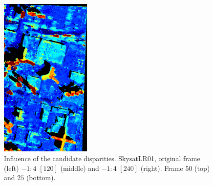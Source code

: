 \documentclass{article}
\theoremstyle{definition}
\begin{document}
\begin{figure}[ht]
 \includegraphics[height=8cm]{images/SkysatLR01_240/1521738847855_dmap_025.png}
 \caption{Influence of the candidate disparities. SkysatLR01, original frame (left) $-1:4$ $[120]$ (middle) and $-1:4$ $[240]$ (right). Frame $50$ (top) and $25$ (bottom).}
 \label{fig:skysatlr01:candidated}
\end{figure}
\end{document}
